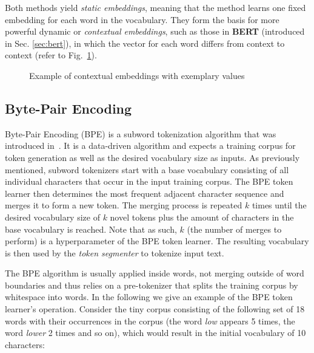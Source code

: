 Both methods yield \textit{static embeddings}, meaning that the method learns
one fixed embedding for each word in the vocabulary. They form the basis for
more powerful dynamic or \textit{contextual embeddings}, such as those in
\textbf{BERT} (introduced in Sec. \ref{sec:bert}), in which the vector for each
word differs from context to context (refer to
Fig.~\ref{fig:context_embedding}).

\begin{figure}[htb]
    \centering
    
    \caption{Example of contextual embeddings with exemplary values}
    \label{fig:context_embedding}
\end{figure}

\subsection{Byte-Pair Encoding} \label{subsec:bpe}

Byte-Pair Encoding (BPE) is a subword tokenization algorithm that was introduced
in~\cite{sennrich2016neural}. It is a data-driven algorithm and expects a
training corpus for token generation as well as the desired vocabulary size as
inputs. As previously mentioned, subword tokenizers start with a base vocabulary
consisting of all individual characters that occur in the input training corpus.
The BPE token learner then determines the most frequent adjacent character
sequence and merges it to form a new token. The merging process is repeated $k$
times until the desired vocabulary size of $k$ novel tokens plus the amount of
characters in the base vocabulary is reached. Note that as such, $k$ (the number
of merges to perform) is a hyperparameter of the BPE token learner. The
resulting vocabulary is then used by the \textit{token segmenter} to tokenize
input text. 

The BPE algorithm is usually applied inside words, not merging outside of word
boundaries and thus relies on a pre-tokenizer that splits the training corpus by
whitespace into words. In the following we give an example of the BPE token
learner's operation. Consider the tiny corpus consisting of the following set of
18 words with their occurrences in the corpus (the word \textit{low} appears 5
times, the word \textit{lower} 2 times and so on), which would result in the
initial vocabulary of 10 characters:

\begin{center}
    
\end{center}

